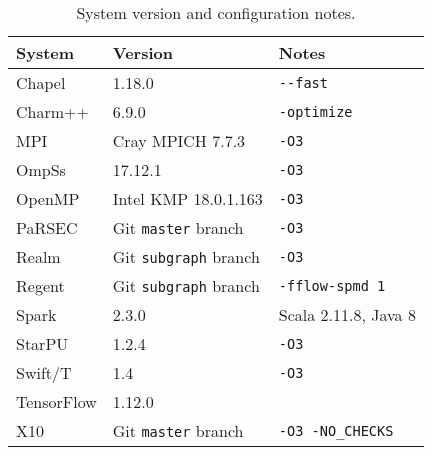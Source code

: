 \begin{table}[t]
\begin{tabular}{l | l | l}
System & Version & Notes \\
\hline
Chapel & 1.18.0 & {\lstinline!--fast!} \\
Charm++ & 6.9.0 & {\lstinline!-optimize!} \\
MPI & Cray MPICH 7.7.3 & {\lstinline!-O3!} \\
OmpSs & 17.12.1 & {\lstinline!-O3!} \\
OpenMP & Intel KMP 18.0.1.163 & {\lstinline!-O3!} \\
PaRSEC & Git {\lstinline!master!} branch & {\lstinline!-O3!} \\
Realm & Git {\lstinline!subgraph!} branch & {\lstinline!-O3!} \\
Regent & Git {\lstinline!subgraph!} branch & {\lstinline!-fflow-spmd 1!} \\
Spark & 2.3.0 & Scala 2.11.8, Java 8 \\
StarPU & 1.2.4 & {\lstinline!-O3!} \\
Swift/T & 1.4 & {\lstinline!-O3!} \\
TensorFlow & 1.12.0 & \\
X10 & Git {\lstinline!master!} branch & {\lstinline!-O3 -NO_CHECKS!}
\end{tabular}

\caption{System version and configuration notes.\label{tab:flags}}
\end{table}
